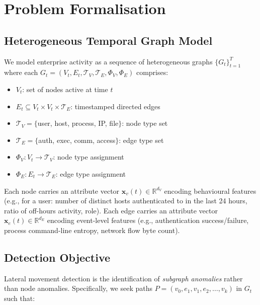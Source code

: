 \documentclass[sigconf,nonacm]{acmart}
\begin{document}
\section{Problem Formalisation}
\label{sec:problem}

\subsection{Heterogeneous Temporal Graph Model}

We model enterprise activity as a sequence of heterogeneous graphs
$\{G_t\}_{t=1}^{T}$ where each $G_t = (V_t, E_t, \mathcal{T}_V, \mathcal{T}_E,
\Phi_V, \Phi_E)$ comprises:

\begin{itemize}
  \item $V_t$: set of nodes active at time $t$
  \item $E_t \subseteq V_t \times V_t \times \mathcal{T}_E$: timestamped
        directed edges
  \item $\mathcal{T}_V = \{$user, host, process, IP, file$\}$: node type set
  \item $\mathcal{T}_E = \{$auth, exec, comm, access$\}$: edge type set
  \item $\Phi_V : V_t \to \mathcal{T}_V$: node type assignment
  \item $\Phi_E : E_t \to \mathcal{T}_E$: edge type assignment
\end{itemize}

Each node carries an attribute vector $\mathbf{x}_v(t) \in \mathbb{R}^{d_V}$
encoding behavioural features (e.g., for a user: number of distinct hosts
authenticated to in the last 24 hours, ratio of off-hours activity, role).
Each edge carries an attribute vector $\mathbf{x}_e(t) \in \mathbb{R}^{d_E}$
encoding event-level features (e.g., authentication success/failure,
process command-line entropy, network flow byte count).

\subsection{Detection Objective}

Lateral movement detection is the identification of \emph{subgraph anomalies}
rather than node anomalies. Specifically, we seek paths
$P = (v_0, e_1, v_1, e_2, \ldots, v_k)$ in $G_t$ such that:
\end{document}
